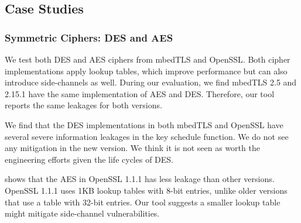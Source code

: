 \subsection{Case Studies}

\subsubsection{Symmetric Ciphers: DES and AES}\label{eval:sym}
We test both DES and AES ciphers from mbedTLS and OpenSSL\@. Both cipher
implementations apply lookup tables, which improve performance but can also introduce side-channels
as well. During our evaluation, we find mbedTLS 2.5 and 2.15.1 have the same
implementation of AES and DES\@. Therefore, our tool reports the same 
leakages for both
versions. 

We find that the DES implementations in both mbedTLS and OpenSSL have several
severe information leakages in the key schedule function.
We do not see any mitigation
in the new version. We think it is not seen as worth the engineering
efforts given the life cycles of DES\@.

\tool{} shows that the AES in OpenSSL 1.1.1 
has less leakage than other versions. 
OpenSSL 1.1.1 
uses 1KB lookup tables with 8-bit entries, unlike older versions that use a 
table with 32-bit entries. Our tool suggests a smaller lookup
table might mitigate side-channel vulnerabilities. 



